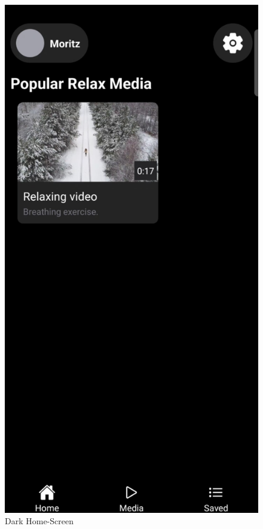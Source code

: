 \begin{figure}[H]
    \begin{minipage}{0.5\textwidth}
        \centering
        \includegraphics[height=2\textwidth]{./pics/dHome.jpg}
        \caption{Dark Home-Screen}

\end{minipage}
\end{figure}
